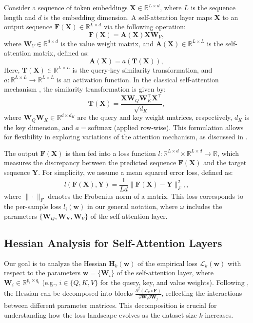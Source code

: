 \documentclass{article}
\begin{document}
Consider a sequence of token embeddings $\mathbf{X} \in \mathbb{R}^{L \times d}$, where $L$ is the sequence length and $d$ is the embedding dimension. A self-attention layer maps $\mathbf{X}$ to an output sequence $\mathbf{F}(\mathbf{X}) \in \mathbb{R}^{L \times d}$ via the following operation:
\[
\mathbf{F}(\mathbf{X}) = \mathbf{A}(\mathbf{X}) \mathbf{X} \mathbf{W}_V,
\]
where $\mathbf{W}_V \in \mathbb{R}^{d \times d}$ is the value weight matrix, and $\mathbf{A}(\mathbf{X}) \in \mathbb{R}^{L \times L}$ is the self-attention matrix, defined as:
\[
\mathbf{A}(\mathbf{X}) = a(\mathbf{T}(\mathbf{X})),
\]
Here, $\mathbf{T}(\mathbf{X}) \in \mathbb{R}^{L \times L}$ is the query-key similarity transformation, and $a : \mathbb{R}^{L \times L} \to \mathbb{R}^{L \times L}$ is an activation function. In the classical self-attention mechanism \cite{vaswani2017attention}, the similarity transformation is given by:
\[
\mathbf{T}(\mathbf{X}) = \frac{\mathbf{X} \mathbf{W}_Q \mathbf{W}_K^\top \mathbf{X}^\top}{\sqrt{d_K}},
\]
where $\mathbf{W}_Q \mathbf{W}_K \in \mathbb{R}^{d \times d_K}$ are the query and key weight matrices, respectively, $d_K$ is the key dimension, and $a = \text{softmax}$ (applied row-wise). This formulation allows for flexibility in exploring variations of the attention mechanism, as discussed in \cite{ormaniec2024attentionhessian}.

The output $\mathbf{F}(\mathbf{X})$ is then fed into a loss function $l : \mathbb{R}^{L \times d} \times \mathbb{R}^{L \times d} \to \mathbb{R}$, which measures the discrepancy between the predicted sequence $\mathbf{F}(\mathbf{X})$ and the target sequence $\mathbf{Y}$. For simplicity, we assume a mean squared error loss, defined as:
\[
l(\mathbf{F}(\mathbf{X}), \mathbf{Y}) = \frac{1}{L d} \|\mathbf{F}(\mathbf{X}) - \mathbf{Y}\|_F^2,,
\]
where $\| \cdot \|_F$ denotes the Frobenius norm of a matrix. This loss corresponds to the per-sample loss $l_i(\mathbf{w})$ in our general notation, where $\omega$ includes the parameters $\{\mathbf{W}_Q, \mathbf{W}_K, \mathbf{W}_V\}$ of the self-attention layer.

\subsection{Hessian Analysis for Self-Attention Layers}
Our goal is to analyze the Hessian $\mathbf{H}_k(\mathbf{w})$ of the empirical loss $\mathcal{L}_k(\mathbf{w})$ with respect to the parameters $\mathbf{w} = \{\mathbf{W}_i\}$ of the self-attention layer, where $\mathbf{W}_i \in \mathbb{R}^{p_i \times q_i}$ (e.g., $i \in \{Q, K, V\}$ for the query, key, and value weights). Following \cite{ormaniec2024attentionhessian}, the Hessian can be decomposed into blocks $\frac{\partial^2 (\mathcal{L}_k \circ \mathbf{F})}{\partial \mathbf{W}_i \partial \mathbf{W}_j}$, reflecting the interactions between different parameter matrices. This decomposition is crucial for understanding how the loss landscape evolves as the dataset size $k$ increases.
\end{document}
